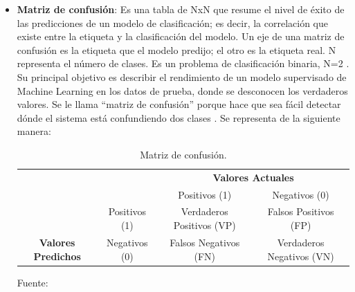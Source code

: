 \begin{itemize}
	\item \textbf{Matriz de confusión}: Es una tabla de NxN que resume el nivel de éxito de las predicciones de un modelo de clasificación; es decir, la correlación que existe entre la etiqueta y la clasificación del modelo. Un eje de una matriz de confusión es la etiqueta que el modelo predijo; el otro es la etiqueta real. N representa el número de clases. Es un problema de clasificación binaria, N=2 \parencite{gl_kohavi1998ml_glossary}. Su principal objetivo es describir el rendimiento de un modelo supervisado de Machine Learning en los datos de prueba, donde se desconocen los verdaderos valores. Se le llama “matriz de confusión” porque hace que sea fácil detectar dónde el sistema está confundiendo dos clases \parencite{gl_bigdata2019metricas}. Se representa de la siguiente manera:
	
	\begin{table}[h!]
		\caption[Matriz de confusión]{Matriz de confusión.}
		\label{2:table2}
		\centering
		\small
		\begin{tabular}{llcc}
			&                                                            & \multicolumn{2}{c}{\textbf{Valores Actuales}}                                                      \\ \cline{3-4} 
			& \multicolumn{1}{l|}{}                                      & \multicolumn{1}{c|}{\cellcolor[HTML]{DAEEF3}Positivos (1)} & \multicolumn{1}{c|}{\cellcolor[HTML]{DAEEF3}Negativos (0)} \\ \cline{2-4} 
			\multicolumn{1}{c|}{}                                             & \multicolumn{1}{c|}{\cellcolor[HTML]{DAEEF3}Positivos (1)} & \multicolumn{1}{c|}{Verdaderos Positivos (VP)}             & \multicolumn{1}{c|}{Falsos Positivos (FP)}                 \\ \cline{2-4} 
			\multicolumn{1}{c|}{\multirow{-2}{*}{\textbf{Valores Predichos}}} & \multicolumn{1}{c|}{\cellcolor[HTML]{DAEEF3}Negativos (0)} & \multicolumn{1}{c|}{Falsos Negativos (FN)}                 & \multicolumn{1}{c|}{Verdaderos Negativos (VN)}             \\ \cline{2-4} 
		\end{tabular}
		\par	%
		\bigskip
		\begin{flushleft}	%
			\small Fuente: \cite{gl_izco2018bdc}
		\end{flushleft}
	\end{table}
	
\end{itemize}

